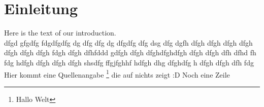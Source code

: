 \chapter{Einleitung}
Here is the text of our introduction. \\
dfgd gfgdfg fdgdfgdfg dg dfg dfg dg dfgdfg dfg dsg dfg dgfh dfgh dfgh dfgh dfgh dfgh dfgh dfgh fdgh dfgh dfhfddd gdfgh dfgh dfghdfghdfgh dfgh dfgh dfh dfhd fh fdg hdfgh dfgh dfgh dfgh shsdfg ffgjfghhf hdfgh dhg dfghdfg h dfgh dfgh dfh fdg \\
Hier kommt eine Quellenangabe \footnote[1]{Hallo Welt} die auf nichts zeigt :D
Noch eine Zeile
